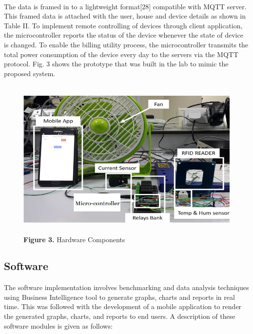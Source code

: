 \documentclass[a4paper,12pt,oneside]{article}
\let\counterwithin\relax
\begin{document}
\paragraph{}
The data is framed in to a lightweight format[28] compatible with MQTT server. This
framed data is attached with the user, house and device details
as shown in Table II. To implement remote controlling of
devices through client application, the microcontroller reports
the status of the device whenever the state of device is
changed. To enable the billing utility process, the
microcontroller transmits the total power consumption of the
device every day to the servers via the MQTT protocol. Fig. 3
shows the prototype that was built in the lab to mimic the
proposed system.
\begin{figure}[H]
\includegraphics[height=8cm,width=16cm]{Figure3.png}
\centering
\caption{\textbf{Figure 3.} Hardware Components}
\end{figure}

\subsection{Software}
\paragraph{}
The software implementation involves benchmarking and
data analysis techniques using Business Intelligence tool to
generate graphs, charts and reports in real time. This was
followed with the development of a mobile application to
render the generated graphs, charts, and reports to end users. A
description of these software modules is given as follows:
\end{document}

